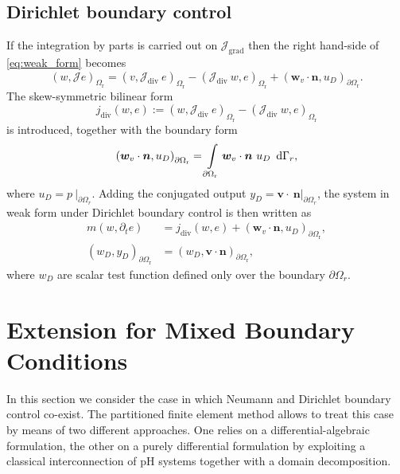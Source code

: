 \documentclass{ifacconf}
\begin{document}
\subsection{Dirichlet boundary control}
\label{sec:dir_bc}
If the integration by parts is carried out on $\mathcal{J}_{\text{grad}}$ then the right hand-side of \eqref{eq:weak_form} becomes
\begin{equation*}
    \left(w, \mathcal{J} e \right)_{\Omega_{\text{r}}} = \left(v, \mathcal{J}_{\text{div}} \ e \right)_{\Omega_{\text{r}}} - \left(\mathcal{J}_{\text{div}} \ w, e \right)_{\Omega_{\text{r}}} + \left(\bm{w}_v \cdot \bm{n}, u_D \right)_{\partial \Omega_{\text{r}}}.
\end{equation*}
The skew-symmetric bilinear form 
\[ j_{\text{div}}(w, e) := \left(w, \mathcal{J}_{\text{div}} \ e \right)_{\Omega_{\text{r}}} - \left(\mathcal{J}_{\text{div}} \ w, e \right)_{\Omega_{\text{r}}} \]
is introduced, together with the boundary form
\begin{equation}
\left(\bm{w}_v \cdot \bm{n}, u_D \right)_{\partial \Omega_{\text{r}}} = \int_{\partial \Omega_{\text{r}}} \bm{w}_v \cdot \bm{n} \ u_D \ \d{\Gamma_r}, 
\end{equation}
where $u_D = p \ \vert_{\partial \Omega_r}$. Adding  the conjugated output $y_D = \bm{v}\cdot~\bm{n}\vert_{\partial \Omega_r}$, the system in weak form under Dirichlet boundary control is then written as
\begin{equation}
\label{eq:wf_div}
\begin{aligned}
m(w, \partial_t{e}) &= j_{\text{div}}(w, e) + \left(\bm{w}_v \cdot \bm{n}, u_D \right)_{\partial \Omega_{\text{r}}}, \\
\left(w_D, y_D \right)_{\partial \Omega_{\text{r}}} &= \left(w_D, \bm{v}\cdot\bm{n} \right)_{\partial \Omega_{\text{r}}},
\end{aligned}
\end{equation}
where $w_D$ are scalar test function defined only over the boundary $\partial \Omega_r$.
\section{Extension for Mixed Boundary Conditions}
\label{sec:mixed_bc}
In this section we consider the case in which Neumann and Dirichlet boundary control co-exist. The partitioned finite element method allows to treat this case by means of two different approaches. One relies on a differential-algebraic formulation, the other on a purely differential formulation by exploiting a classical interconnection of pH systems together with a domain decomposition.
\end{document}
